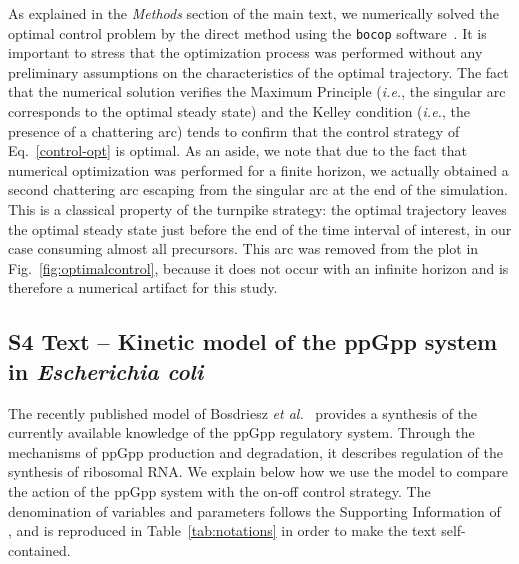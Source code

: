 As explained in the \textit{Methods} section of the main text, we numerically solved the optimal control problem by the direct method using the \texttt{bocop} software~\cite{bonnans_bocop_2012}. 
It is important to stress that the optimization process was performed without any preliminary assumptions on the characteristics of the optimal trajectory. 
The fact that the numerical solution verifies the Maximum Principle (\textit{i.e.}, the singular arc corresponds to the optimal steady state) and the Kelley condition (\textit{i.e.}, the presence of a chattering arc)
tends to confirm that the control strategy of Eq.~\ref{control-opt} is optimal. As an aside, we note that due to the fact that numerical optimization was performed for a finite horizon, we actually obtained a second chattering arc escaping from the singular arc at the end of the simulation.  This is a classical property of the turnpike strategy: the optimal trajectory leaves the optimal steady state just before the end of the time interval of interest, in our case consuming almost all precursors. This arc was removed from the plot in Fig.~\ref{fig:optimalcontrol}, because it does not occur with an infinite horizon and is therefore a numerical artifact for this study.

\clearpage

\subsection[S4 Text -- Kinetic model of the ppGpp system]{S4 Text -- Kinetic model of the ppGpp system in \textit{Escherichia coli}}

The recently published model of Bosdriesz \textit{et al.}~\cite{bosdriesz_how_2015} provides a synthesis of the currently available knowledge of the ppGpp regulatory system.
Through the mechanisms of ppGpp production and degradation, it describes regulation of the synthesis of ribosomal RNA.
We explain below how we use the model to compare the action of the ppGpp system with the on-off control strategy.
The denomination of variables and parameters follows the Supporting Information of~\cite{bosdriesz_how_2015} , and is reproduced in Table~\ref{tab:notations} in order to make the text self-contained.


